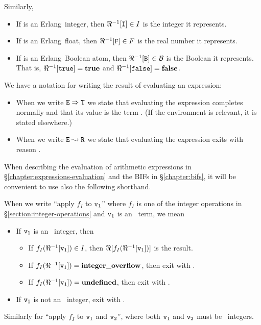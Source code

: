 Similarly,
\begin{itemize}
\item If  is an Erlang\ integer, then $\Re^{-1}[{\tt{\sl I}}]\in I$ is the
integer it represents.
\item If  is an Erlang\ float, then $\Re^{-1}[{\tt{\sl F}}]\in F$ is the
real number it represents.
\item If  is an Erlang\ Boolean atom, then $\Re^{-1}[{\tt{\sl B}}]\in\mathcal{B}$ is the
Boolean it represents.
That is, $\Re^{-1}[{\tt true}]={\bf true}$ and $\Re^{-1}[{\tt false}]={\bf false}$.
\end{itemize}

We have a notation for writing the result of evaluating an expression:
\begin{itemize}
\item When we write $\TZ{E}\RETURNS\TZ{T}$
we state that evaluating the expression
 completes normally and that its value is the term .  (If the
environment is relevant, it is stated elsewhere.)
\item When we write $\TZ{E}\EXITSWITH\TZ{R}$
we state that evaluating the expression
 exits with reason .
\end{itemize}

\iffalse
\label{section:arith-shorthand}

When describing the evaluation of arithmetic expressions in
\S\ref{chapter:expressions-evaluation} and the BIFs in \S\ref{chapter:bifs},
it will be convenient to use also the following shorthand.


When we write ``apply $f_I$ to ${\tt{\sl v}}_1$'' where
$f_I$ is one of the integer operations in
\S\ref{section:integer-operations} and ${\tt{\sl v}}_1$ is an \Erlang\ term, we mean
\begin{itemize}
\item If ${\tt{\sl v}}_1$ is an \Erlang\ integer, then
\begin{itemize}
\item If $f_I(\Re^{-1}[{\tt{\sl v}}_1])\in I$, then $\Re[f_I(\Re^{-1}[{\tt{\sl v}}_1])]$
is the result.
\item If $f_I(\Re^{-1}[{\tt{\sl v}}_1])={\bf integer\_overflow}$, then exit with .
\item If $f_I(\Re^{-1}[{\tt{\sl v}}_1])={\bf undefined}$, then exit with .
\end{itemize}
\item If ${\tt{\sl v}}_1$ is not an \Erlang\ integer, exit with \T{\badarith}.
\end{itemize}
Similarly for ``apply $f_I$ to ${\tt{\sl v}}_1$ and ${\tt{\sl v}}_2$'', where both
${\tt{\sl v}}_1$ and ${\tt{\sl v}}_2$ must be \Erlang\ integers.

